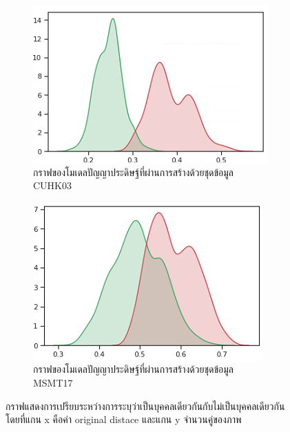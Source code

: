 \begin{figure}[!ht]
\begin{subfigure}[b]{0.4\textwidth}
        \includegraphics[width=\textwidth]{chapter4/images/graph_cuhk.png}
	\caption{กราฟของโมเดลปัญญาประดิษฐ์ที่ผ่านการสร้างด้วยชุดข้อมูล CUHK03}
        \label{fig:graph_cuhk}
    \end{subfigure}
    \hfill
    \begin{subfigure}[b]{0.4\textwidth}
        \centering
        \includegraphics[width=\textwidth]{chapter4/images/graph_msmt.png}
	\caption{กราฟของโมเดลปัญญาประดิษฐ์ที่ผ่านการสร้างด้วยชุดข้อมูล MSMT17}
        \label{fig:graph_msmt}
    \end{subfigure}
    \hfill
    \caption{กราฟแสดงการเปรียบระหว่างการระบุว่าเป็นบุคคลเดียวกันกับไม่เป็นบุคคลเดียวกัน โดยที่แกน x คือค่า original distace และแกน y จำนวนคู่ของภาพ }
    \label{fig: กราฟแสดงการเปรียบระหว่างการระบุว่าเป็นบุคคลเดียวกันกับไม่เป็นบุคคลเดียวกัน}
\end{figure}
\clearpage
